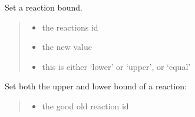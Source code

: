 \documentclass[letterpaper,12pt,english]{sphinxmanual}
\begin{document}
\begin{fulllineitems}
\begin{fulllineitems}
\end{fulllineitems}


\begin{fulllineitems}
\label{\detokenize{api/core:cbmpy.CBModel.Model.setReactionBound}}
\pysigstartsignatures
\pysiglinewithargsret
{}
{\sphinxparamcomma {}\sphinxparamcomma {}}
{}
\pysigstopsignatures
\sphinxAtStartPar
Set a reaction bound.
\begin{quote}\begin{description}
\begin{itemize}
\item {} 
\sphinxAtStartPar
{} \textendash{} the reactions id

\item {} 
\sphinxAtStartPar
{} \textendash{} the new value

\item {} 
\sphinxAtStartPar
{} \textendash{} this is either ‘lower’ or ‘upper’, or ‘equal’

\end{itemize}

\end{description}\end{quote}

\end{fulllineitems}


\begin{fulllineitems}
\label{\detokenize{api/core:cbmpy.CBModel.Model.setReactionBounds}}
\pysigstartsignatures
\pysiglinewithargsret
{}
{\sphinxparamcomma {}\sphinxparamcomma {}}
{}
\pysigstopsignatures
\sphinxAtStartPar
Set both the upper and lower bound of a reaction:
\begin{quote}\begin{description}
\begin{itemize}
\item {} 
\sphinxAtStartPar
{} \textendash{} the good old reaction id


\end{itemize}
\end{description}
\end{quote}
\end{fulllineitems}
\end{fulllineitems}
\end{document}
